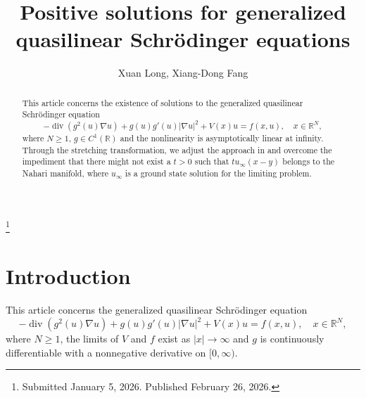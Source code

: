 \documentclass[reqno]{amsart}
\begin{document}
\title[\hfilneg EJDE-2026/19\hfil Generalized quasilinear Schr\"odinger equations]
{Positive solutions for generalized quasilinear Schr\"odinger equations}

\author[X. Long, X.-D. Fang \hfil EJDE-2026/19\hfilneg]
{Xuan Long, Xiang-Dong Fang}

\address{Xuan Long\newline 
School of Mathematical Sciences, 
Dalian University of Technology, 
116024 Dalian, China}

\address{Xiang-Dong Fang (corresponding author)\newline
School of Mathematical Sciences, 
Dalian University of Technology, 
116024 Dalian, China}

\thanks{Submitted January 5, 2026. Published February 26, 2026.}

\begin{abstract}
This article concerns the existence of solutions to the generalized quasilinear Schr\"odinger equation
\begin{equation*}
-\operatorname{div} (g^2(u)\nabla u)+g(u)g'(u)|\nabla u|^2+V(x)u=f(x,u), \quad 
x\in \mathbb{R}^{N},
\end{equation*} 
where  $N \ge 1$, $g \in C^1(\mathbb{R})$ and the nonlinearity is asymptotically linear at infinity. 
Through the stretching transformation, we adjust the approach in \cite{Ambrosetti} %
and overcome the impediment that there might not exist a $t>0$ such that $t u_\infty(x-y)$ 
belongs to the Nahari manifold, where $u_\infty$ is a  ground state solution for the limiting problem.
\end{abstract}

\maketitle
{}
\newtheorem{theorem}{Theorem}[section]
\newtheorem{lemma}[theorem]{Lemma}
\newtheorem{proposition}[theorem]{Proposition}
\newtheorem{remark}[theorem]{Remark}
\allowdisplaybreaks

\section{Introduction}

This article concerns the generalized quasilinear Schr\"odinger equation
\begin{equation}
\label{p1}
-\operatorname{div} (g^2(u)\nabla u)+g(u)g'(u)|\nabla u|^2+V(x)u=f(x,u), \quad x\in \mathbb{R}^{N},
\end{equation}
where $N \ge 1$, the limits of $V$ and $f$ exist as $|x| \to \infty$ and $g$  is continuously differentiable with a nonnegative derivative on $[0, \infty)$. 
\end{document}
